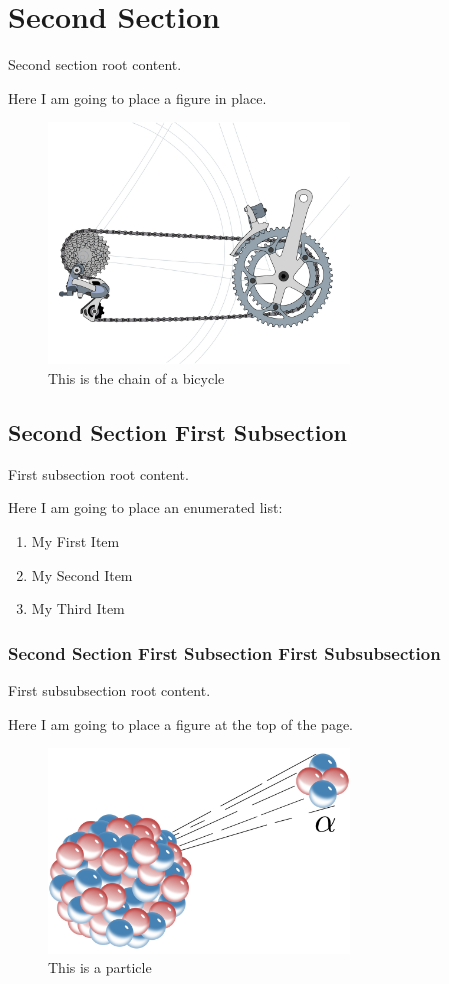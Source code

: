 \documentclass[12pt,twocolumn,a4paper,twoside]{IEEEtran}
\begin{document}
\section{Second Section}
Second section root content.


Here I am going to place a figure in place.

\begin{figure}[h]
\includegraphics[width=80mm]{resources/bicycle.png}
\caption{This is the chain of a bicycle}
\label{bicycleFigure}
\end{figure}


\subsection{Second Section First Subsection}
First subsection root content.

Here I am going to place an enumerated list:

\begin{enumerate}
\item My First Item
\item My Second Item
\item My Third Item
\end{enumerate}

\subsubsection{Second Section First Subsection First Subsubsection}
First subsubsection root content.


Here I am going to place a figure at the top of the page.

\begin{figure}[t]
\begin{center}
\includegraphics[width=80mm]{resources/particle.png}
\caption{This is a particle}
\label{particleFigure}
\end{center}
\end{figure}
\end{document}

